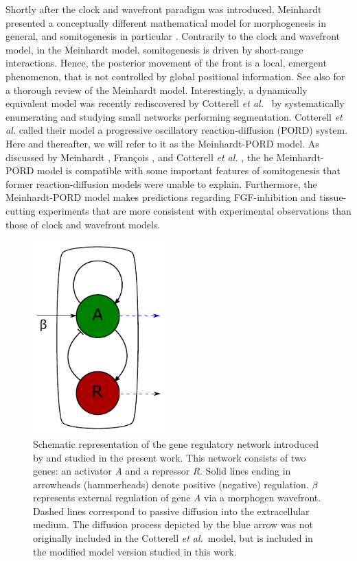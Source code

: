 \documentclass[%
 preprint,
 aip, 
 amsmath,amssymb,
]{revtex4-2}
\begin{document}
Shortly after the clock and wavefront paradigm was introduced, Meinhardt presented a conceptually different mathematical model for morphogenesis in general, and somitogenesis in particular \cite{Meinhardt1982}. Contrarily to the clock and wavefront model, in the Meinhardt model, somitogenesis is driven by short-range interactions. Hence, the posterior movement of the front is a local, emergent phenomenon, that is not controlled by global positional information. See also \cite{Francois2018} for a thorough review of the Meinhardt model. Interestingly, a dynamically equivalent model was recently rediscovered by Cotterell \emph{et al.}~\cite{Cotterell2015} by systematically enumerating and studying small networks performing segmentation. Cotterell \emph{et al.} called their model a progressive oscillatory reaction-diffusion (PORD) system. Here and thereafter, we will refer to it as the Meinhardt-PORD model. As discussed by Meinhardt \citep{Meinhardt1982}, Fran\c{c}ois \citep{Francois2018}, and Cotterell \emph{et al.} \cite{Cotterell2015}, the he Meinhardt-PORD model is compatible with some important features of somitogenesis that former reaction-diffusion models were unable to explain. Furthermore, the Meinhardt-PORD model makes predictions regarding FGF-inhibition and tissue-cutting experiments that are more consistent with experimental observations than those of clock and wavefront models.
	
	\begin{figure}[t!]
		\centering
		\includegraphics[width=2in]{Fig01.pdf}
		\caption{Schematic representation of the gene regulatory network introduced by
			\cite{Cotterell2015} and studied in the present work. This network consists of
			two genes: an activator \textit{A} and a repressor \textit{R}. Solid lines
			ending in arrowheads (hammerheads) denote positive (negative) regulation.
			$\beta$ represents external regulation of gene \textit{A} via a 
			morphogen wavefront. Dashed lines correspond to passive diffusion into the extracellular
			medium. The diffusion process depicted by the blue arrow was not
			originally included in the Cotterell {\em et al.}~model, but is 
			included in the modified model version studied in this work.}
		\label{Fig01}
	\end{figure}
	
\end{document}
